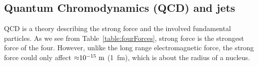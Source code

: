  
  




 



\subsection{Quantum Chromodynamics (QCD) and jets}

QCD is a theory describing the strong force and the involved fundamental particles. 
As we see from Table~\ref{table:fourForces}, strong force is the strongest force of the four. 
However, unlike the long range electromagnetic force, 
the strong force could only affect ${\rm {\approx} 10^{-15}~m}$ (1~fm), which is about the radius of 
a nucleus. 

